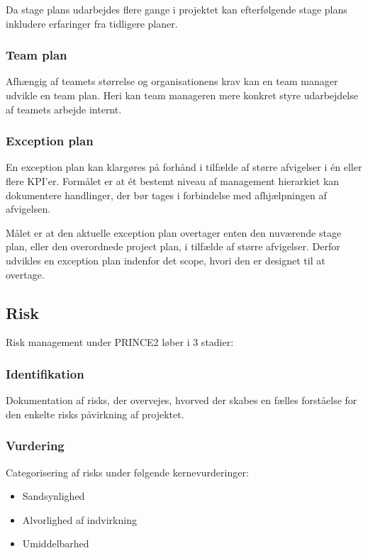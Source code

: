 \documentclass[12pt,twoside]{article}
\begin{document}
    Da stage plans udarbejdes flere gange i projektet kan efterfølgende stage plans inkludere erfaringer fra tidligere planer.

    \subsubsection*{Team plan}
    Afhængig af teamets størrelse og organisationens krav kan en team manager udvikle en team plan. Heri kan team manageren mere konkret styre udarbejdelse af teamets arbejde internt. 

    \subsubsection*{Exception plan}
    En exception plan kan klargøres på forhånd i tilfælde af større afvigelser i én eller flere KPI'er. Formålet er at ét bestemt niveau af management hierarkiet kan dokumentere handlinger, der bør tages i forbindelse med afhjælpningen af afvigelsen.

    Målet er at den aktuelle exception plan overtager enten den nuværende stage plan, eller den overordnede project plan, i tilfælde af større afvigelser. Derfor udvikles en exception plan indenfor det scope, hvori den er designet til at overtage.

    \subsection{Risk}
    Risk management under PRINCE2 løber i 3 stadier:

    \subsubsection*{Identifikation}
    Dokumentation af risks, der overvejes, hvorved der skabes en fælles forståelse for den enkelte risks påvirkning af projektet.

    \subsubsection*{Vurdering}
    Categorisering af risks under følgende kernevurderinger:
    \begin{itemize}
        \item Sandsynlighed
        \item Alvorlighed af indvirkning
        \item Umiddelbarhed
    \end{itemize}
\end{document}
